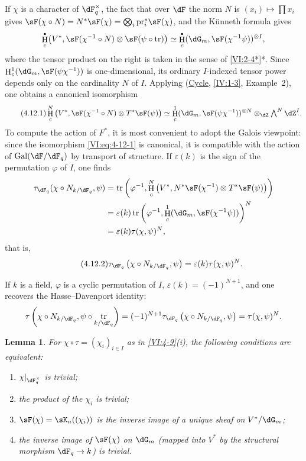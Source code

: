 \documentclass[12pt,oneside,english]{smfbook}
\DeclareMathOperator{\gal}{Gal}
\DeclareMathOperator{\h}{H}
\DeclareMathOperator{\tr}{tr}
\newcounter{char}
\newcommand{\pr}{\mathrm{pr}} %
\newtheorem{lemma_}[subsection]{Lemma}
\let\oldbullet\bullet
\renewcommand{\bullet}{\textnormal{\tiny$\oldbullet$}}
\begin{document}
If $\chi$ is a character of $\dF_q^\times$, the fact that over $\dF$ the norm $N$ is $(x_i)\mapsto\prod x_i$ gives $\sF(\chi\circ N)=N^\ast\sF(\chi) =\bigotimes_i\pr_i^\ast\sF(\chi)$, and the Künneth formula gives
\[
  \h_c^\bullet\bigl(V^\ast,
    \sF(\chi^{-1}\circ N)\otimes\sF(\psi\circ\tr)\bigr)
  \simeq
  \h_c^\bullet(\dG_m,\sF(\chi^{-1}\psi))^{\otimes I},
\]
where the tensor product on the right is taken in the sense of \ref{VI:2-4*}*. Since $\h_c^1(\dG_m,\sF(\psi\chi^{-1}))$ is one-dimensional, its ordinary $I$-indexed tensor power depends only on the cardinality $N$ of $I$. Applying (\hyperref[IV]{Cycle}, \ref{IV:1-3}, Example~2), one obtains a canonical isomorphism
\begin{equation*}\tag{4.12.1}\label{VI:eq:4-12-1}
  \h_c^N\left(V^\ast,\sF(\chi^{-1}\circ N)\otimes T^\ast\sF(\psi)\right)
  \simeq
  \h_c^1(\dG_m,\sF(\psi\chi^{-1}))^{\otimes N}
  \otimes_\dZ \textstyle\bigwedge^N\dZ^I.
\end{equation*}
To compute the action of $F^\ast$, it is most convenient to adopt the Galois viewpoint: since the isomorphism \eqref{VI:eq:4-12-1} is canonical, it is compatible with the action of $\gal(\dF/\dF_q)$ by transport of structure. If $\varepsilon(k)$ is the sign of the permutation $\varphi$ of $I$, one finds
\begin{align*}
  \tau_{\dF_q}(\chi\circ N_{k/\dF_q},\psi)
    &= \tr\left(\varphi^{-1},\h_c^N\left(V^\ast,N^\ast\sF(\chi^{-1})\otimes T^\ast \sF(\psi)\right)\right) \\
    &= \varepsilon(k) \tr\left(\varphi^{-1},\h_c^1(\dG_m,\sF(\chi^{-1}\psi))\right)^N \\
    &= \varepsilon(k) \tau(\chi,\psi)^N \text{,}
\end{align*}
that is,
\begin{equation*}\tag{4.12.2}\label{VI:eq:4-12-2}
  \tau_{\dF_q}\left(\chi\circ N_{k/\dF_q},\psi\right) = \varepsilon(k) \tau(\chi,\psi)^N \text{.}
\end{equation*}

If $k$ is a field, $\varphi$ is a cyclic permutation of $I$, $\varepsilon(k)=(-1)^{N+1}$, and one recovers the Hasse--Davenport identity:
\[
  \tau\left(\chi\circ N_{k/\dF_q},\psi\circ \tr_{k/\dF_q}\right) = (-1)^{N+1} \tau_{\dF_q}\left(\chi\circ N_{k/\dF_q},\psi\right) = \tau(\chi,\psi)^N \text{.}
\]

\begin{lemma_}\label{VI:4-13}
For $\chi\circ\tau=(\chi_i)_{i\in I}$ as in \ref{VI:4-9}(i), the following conditions are equivalent:
\begin{enumerate}[\indent (i)]
  \item $\chi|_{\dF_q^\times}$ is trivial;
  \item the product of the $\chi_i$ is trivial;
  \item $\sF(\chi)=\sK_n((\chi_i))$ is the inverse image of a unique sheaf on $V^\ast/\dG_m$;
  \item the inverse image of $\sF(\chi)$ on $\dG_m$ (mapped into $V^\ast$ by the structural morphism $\dF_q\to k$) is trivial.
\end{enumerate}
\end{lemma_}
\end{document}
